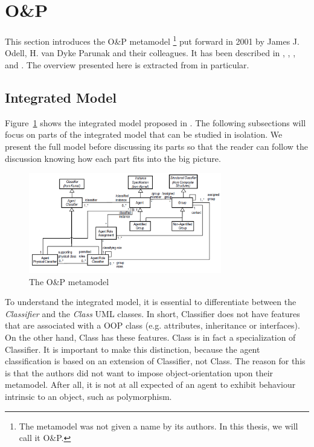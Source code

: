 \section{O\&P}

This section introduces the O\&P metamodel
\footnote{The metamodel was not given a name by its authors. In this thesis, we will call it O\&P.}
put forward in 2001 by James J. Odell, H. van Dyke Parunak and their colleagues.
It has been described in \cite{Odell01}, \cite{Parunak02}, \cite{Odell03b}, \cite{Odell04b} and \cite{Odell05}.
The overview presented here is extracted from \cite{Odell05} in particular.

\subsection{Integrated Model}

Figure~\ref{figure:onp-metamodel} shows the integrated model proposed in \cite{Odell05}.
The following subsections will focus on parts of the integrated model that can be studied in isolation.
We present the full model before discussing its parts so that the reader can follow the discussion knowing how each part fits into the big picture.

\begin{figure}[ht]
	\centering
	\includegraphics[width=0.75\textwidth]{images/onp/onp-metamodel.png}
	\caption{The O\&P metamodel}
	\label{figure:onp-metamodel}
\end{figure}

To understand the integrated model, it is essential to differentiate between the \textit{Classifier} and the \textit{Class} UML classes.
In short, Classifier does not have features that are associated with a OOP class (e.g. attributes, inheritance or interfaces).
On the other hand, Class has these features.
Class is in fact a specialization of Classifier.
It is important to make this distinction, because the agent classification is based on an extension of Classifier, not Class.
The reason for this is that the authors did not want to impose object-orientation upon their metamodel.
After all, it is not at all expected of an agent to exhibit behaviour intrinsic to an object, such as polymorphism. 

